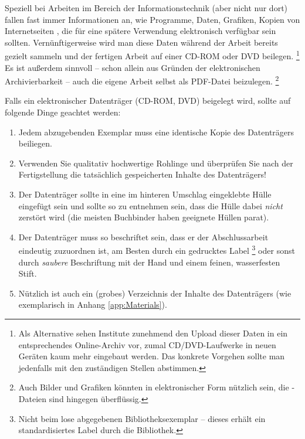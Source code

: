 Speziell bei Arbeiten im Bereich der Informationstechnik (aber nicht nur
dort) fallen fast immer Informationen an, wie Programme, Daten, Grafiken,
Kopien von Internetseiten \usw, die für eine spätere Verwendung elektronisch
verfügbar sein sollten. Vernünftigerweise wird man diese Daten während der
Arbeit bereits gezielt sammeln und der fertigen Arbeit auf einer CD-ROM oder
DVD beilegen.%
\footnote{Als Alternative sehen Institute zunehmend den Upload dieser Daten
in ein entsprechendes Online-Archiv vor, zumal CD/DVD-Laufwerke in neuen
Geräten kaum mehr eingebaut werden. Das konkrete Vorgehen sollte man
jedenfalls mit den zuständigen Stellen abstimmen.}
Es ist außerdem sinnvoll -- schon allein aus Gründen der elektronischen
Archivierbarkeit -- auch die eigene Arbeit selbst als PDF-Datei beizulegen.%
\footnote{Auch Bilder und Grafiken könnten in elektronischer Form nützlich
sein, die \latex-Dateien sind hingegen überflüssig.}

Falls ein elektronischer Datenträger (CD-ROM, DVD) beigelegt wird, sollte auf
folgende Dinge geachtet werden:
%
\begin{enumerate}
	\item Jedem abzugebenden Exemplar muss eine identische Kopie des
	Datenträgers beiliegen.
	\item Verwenden Sie qualitativ hochwertige Rohlinge und überprüfen
	Sie nach der Fertigstellung die tatsächlich gespeicherten Inhalte
	des Datenträgers!
	\item Der Datenträger sollte in eine im hinteren Umschlag eingeklebte
	Hülle eingefügt sein und sollte so zu entnehmen sein, dass die Hülle
	dabei \emph{nicht} zerstört wird (die meisten Buchbinder haben geeignete
	Hüllen parat).
	\item Der Datenträger muss so beschriftet sein, dass er der
	Abschlussarbeit eindeutig zuzuordnen ist, am Besten durch ein
	gedrucktes Label%
	\footnote{Nicht beim lose abgegebenen Bibliotheksexemplar --
	dieses erhält ein standardisiertes Label durch die Bibliothek.}
	oder sonst durch \emph{saubere}	Beschriftung mit der Hand und einem
	feinen, wasserfesten Stift.
	\item Nützlich ist auch ein (grobes) Verzeichnis der Inhalte des
	Datenträgers (wie exemplarisch in Anhang \ref{app:Materials}).
\end{enumerate}
